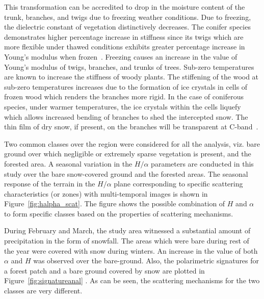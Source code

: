 This transformation can be accredited to drop in the moisture content of the trunk, branches, and twigs due to freezing weather conditions. Due to freezing, the dielectric constant of vegetation distinctively decreases. The conifer species demonstrates higher percentage increase in stiffness since its twigs which are more flexible under thawed conditions exhibits greater percentage increase in Young’s modulus when frozen~\cite{dobson1990effects}. Freezing causes an increase in the value of Young's modulus of twigs, branches, and trunks of trees. Sub-zero temperatures are known to increase the stiffness of woody plants. The stiffening of the wood at sub-zero temperatures increases due to the formation of ice crystals in cells of frozen wood which renders the branches more rigid. In the case of coniferous species, under warmer temperatures, the ice crystals within the cells liquefy which allows increased bending of branches to shed the intercepted snow. The thin film of dry snow, if present, on the branches will be transparent at C-band~\cite{bernier1998potential}.

Two common classes over the region were considered for all the analysis, viz. bare ground over which negligible or extremely sparse vegetation is present, and the forested area. A seasonal variation in the $H/\alpha$ parameters are conducted in this study over the bare snow-covered ground and the forested
areas. The seasonal response of the terrain in the $H/\alpha$ plane corresponding to specific scattering characteristics (or zones) with multi-temporal images is shown in Figure~\ref{fig:halpha_scat}. The figure shows the possible combination of $H$ and $\alpha$ to form specific classes based on the properties of scattering mechanisms.

During February and March, the study area witnessed a substantial amount of precipitation in the form of snowfall. The areas which were bare during rest of the year were covered with snow during winters. An increase in the value of both $\alpha$ and $H$ was observed over the bare-ground.
%
Also, the polarimetric signatures for a forest patch and a bare ground covered by snow are plotted in Figure~\ref{fig:signatureanal} . As can be seen, the scattering mechanisms for the two classes are very different. 

